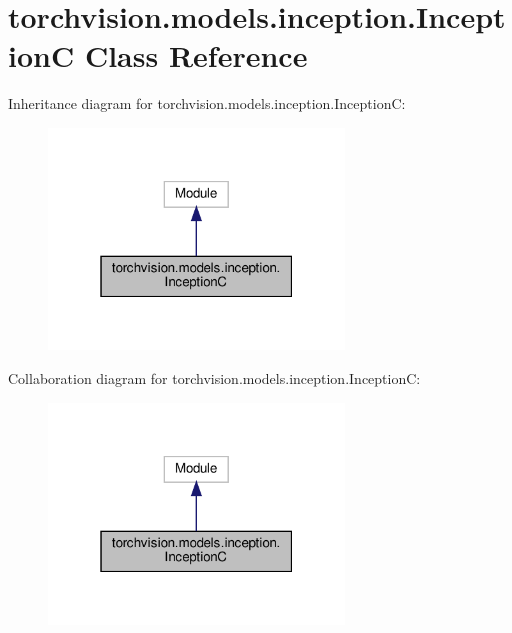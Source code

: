 \hypertarget{classtorchvision_1_1models_1_1inception_1_1InceptionC}{}\section{torchvision.\+models.\+inception.\+InceptionC Class Reference}
\label{classtorchvision_1_1models_1_1inception_1_1InceptionC}


Inheritance diagram for torchvision.\+models.\+inception.\+InceptionC\+:
\nopagebreak
\begin{figure}[H]
\begin{center}
\leavevmode
\includegraphics[width=223pt]{classtorchvision_1_1models_1_1inception_1_1InceptionC__inherit__graph}
\end{center}
\end{figure}


Collaboration diagram for torchvision.\+models.\+inception.\+InceptionC\+:
\nopagebreak
\begin{figure}[H]
\begin{center}
\leavevmode
\includegraphics[width=223pt]{classtorchvision_1_1models_1_1inception_1_1InceptionC__coll__graph}
\end{center}
\end{figure}
